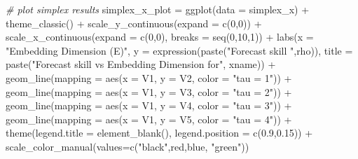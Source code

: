 \documentclass[
]{article}
\newenvironment{Shaded}{\begin{snugshade}}{\end{snugshade}}
\newcommand{\AttributeTok}[1]{\textcolor[rgb]{0.77,0.63,0.00}{#1}}
\newcommand{\CommentTok}[1]{\textcolor[rgb]{0.56,0.35,0.01}{\textit{#1}}}
\newcommand{\DecValTok}[1]{\textcolor[rgb]{0.00,0.00,0.81}{#1}}
\newcommand{\FloatTok}[1]{\textcolor[rgb]{0.00,0.00,0.81}{#1}}
\newcommand{\FunctionTok}[1]{\textcolor[rgb]{0.00,0.00,0.00}{#1}}
\newcommand{\NormalTok}[1]{#1}
\newcommand{\OtherTok}[1]{\textcolor[rgb]{0.56,0.35,0.01}{#1}}
\newcommand{\SpecialCharTok}[1]{\textcolor[rgb]{0.00,0.00,0.00}{#1}}
\newcommand{\StringTok}[1]{\textcolor[rgb]{0.31,0.60,0.02}{#1}}
\begin{document}
\begin{Shaded}
\begin{Highlighting}[]
\CommentTok{\# plot simplex results}
\NormalTok{simplex\_x\_plot }\OtherTok{=} \FunctionTok{ggplot}\NormalTok{(}\AttributeTok{data =}\NormalTok{ simplex\_x) }\SpecialCharTok{+} \FunctionTok{theme\_classic}\NormalTok{() }\SpecialCharTok{+} \FunctionTok{scale\_y\_continuous}\NormalTok{(}\AttributeTok{expand =} \FunctionTok{c}\NormalTok{(}\DecValTok{0}\NormalTok{,}\DecValTok{0}\NormalTok{)) }\SpecialCharTok{+} \FunctionTok{scale\_x\_continuous}\NormalTok{(}\AttributeTok{expand =} \FunctionTok{c}\NormalTok{(}\DecValTok{0}\NormalTok{,}\DecValTok{0}\NormalTok{), }\AttributeTok{breaks =} \FunctionTok{seq}\NormalTok{(}\DecValTok{0}\NormalTok{,}\DecValTok{10}\NormalTok{,}\DecValTok{1}\NormalTok{)) }\SpecialCharTok{+}
  \FunctionTok{labs}\NormalTok{(}\AttributeTok{x =} \StringTok{"Embedding Dimension (E)"}\NormalTok{, }\AttributeTok{y =} \FunctionTok{expression}\NormalTok{(}\FunctionTok{paste}\NormalTok{(}\StringTok{"Forecast skill "}\NormalTok{,rho)), }\AttributeTok{title =} \FunctionTok{paste}\NormalTok{(}\StringTok{"Forecast skill vs Embedding Dimension for"}\NormalTok{, xname)) }\SpecialCharTok{+}
  \FunctionTok{geom\_line}\NormalTok{(}\AttributeTok{mapping =} \FunctionTok{aes}\NormalTok{(}\AttributeTok{x =}\NormalTok{ V1, }\AttributeTok{y =}\NormalTok{ V2, }\AttributeTok{color =} \StringTok{"tau = 1"}\NormalTok{)) }\SpecialCharTok{+}
  \FunctionTok{geom\_line}\NormalTok{(}\AttributeTok{mapping =} \FunctionTok{aes}\NormalTok{(}\AttributeTok{x =}\NormalTok{ V1, }\AttributeTok{y =}\NormalTok{ V3, }\AttributeTok{color =} \StringTok{"tau = 2"}\NormalTok{)) }\SpecialCharTok{+}
  \FunctionTok{geom\_line}\NormalTok{(}\AttributeTok{mapping =} \FunctionTok{aes}\NormalTok{(}\AttributeTok{x =}\NormalTok{ V1, }\AttributeTok{y =}\NormalTok{ V4, }\AttributeTok{color =} \StringTok{"tau = 3"}\NormalTok{)) }\SpecialCharTok{+}
  \FunctionTok{geom\_line}\NormalTok{(}\AttributeTok{mapping =} \FunctionTok{aes}\NormalTok{(}\AttributeTok{x =}\NormalTok{ V1, }\AttributeTok{y =}\NormalTok{ V5, }\AttributeTok{color =} \StringTok{"tau = 4"}\NormalTok{)) }\SpecialCharTok{+}
  \FunctionTok{theme}\NormalTok{(}\AttributeTok{legend.title =} \FunctionTok{element\_blank}\NormalTok{(), }\AttributeTok{legend.position =} \FunctionTok{c}\NormalTok{(}\FloatTok{0.9}\NormalTok{,}\FloatTok{0.15}\NormalTok{)) }\SpecialCharTok{+}
  \FunctionTok{scale\_color\_manual}\NormalTok{(}\AttributeTok{values=}\FunctionTok{c}\NormalTok{(}\StringTok{"black"}\NormalTok{,}\StringTok{\textquotesingle{}red\textquotesingle{}}\NormalTok{,}\StringTok{\textquotesingle{}blue\textquotesingle{}}\NormalTok{, }\StringTok{"green"}\NormalTok{))}


\end{Highlighting}
\end{Shaded}
\end{document}
